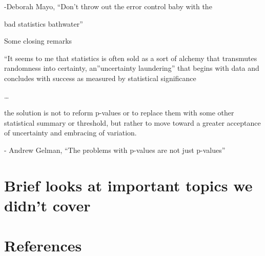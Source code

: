 \documentclass[
  letterpaper,
  DIV=11,
  numbers=noendperiod]{scrreprt}
\newlength{\cslhangindent}
\newlength{\cslentryspacingunit} %
\newenvironment{CSLReferences}[2] %
 {%
  \setlength{\parindent}{0pt}
  \ifodd #1
  \let\oldpar\par
  \def\par{\hangindent=\cslhangindent\oldpar}
  \fi
  \setlength{\parskip}{#2\cslentryspacingunit}
 }%
 {}
\begin{document}
-Deborah Mayo, ``Don't throw out the error control baby with the

bad statistics bathwater''

Some closing remarks

``It seems to me that statistics is often sold as a sort of alchemy that
transmutes randomness into certainty, an''uncertainty laundering'' that
begins with data and concludes with success as measured by statistical
significance

\ldots{}

the solution is not to reform p-values or to replace them with some
other statistical summary or threshold, but rather to move toward a
greater acceptance of uncertainty and embracing of variation.

- Andrew Gelman, ``The problems with p-values are not just p-values''


\hypertarget{brief-looks-at-important-topics-we-didnt-cover}{%
\chapter{Brief looks at important topics we didn't
cover}\label{brief-looks-at-important-topics-we-didnt-cover}}


\hypertarget{references}{%
\chapter*{References}\label{references}}


\hypertarget{refs}{}
\begin{CSLReferences}{0}{0}
\end{CSLReferences}
\end{document}
